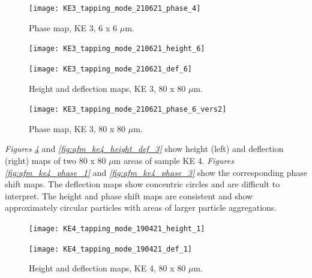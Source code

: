 \begin{figure}[H]
\centering
  \texttt{[image: KE3\_tapping\_mode\_210621\_phase\_4]}
\caption[Phase map, KE 3]{Phase map, KE 3, 6 x 6 $\mu$m.}
\label{fig:afm_ke3_phase_4}
\end{figure}


\begin{figure}[H]
\centering
\begin{minipage}{.45\textwidth}
  \centering
  \texttt{[image: KE3\_tapping\_mode\_210621\_height\_6]}
\end{minipage}
\begin{minipage}{.45\textwidth}
  \centering
  \texttt{[image: KE3\_tapping\_mode\_210621\_def\_6]}
\end{minipage}
\caption[Height and deflection maps, KE 3]{Height and deflection maps, KE 3, 80 x 80 $\mu$m.}
\label{fig:afm_ke3_height_def_5}
\end{figure}

\begin{figure}[H]
\centering
  \texttt{[image: KE3\_tapping\_mode\_210621\_phase\_6\_vers2]}
\caption[Phase map, KE 3]{Phase map, KE 3, 80 x 80 $\mu$m.}
\label{fig:afm_ke3_phase_5}
\end{figure}



\textit{Figures \ref{fig:afm_ke4_height_def_1}} and \textit{\ref{fig:afm_ke4_height_def_3}} show height (left) and deflection (right) maps of two 80 x 80 $\mu$m areas of sample KE 4. \textit{Figures \ref{fig:afm_ke4_phase_1}} and \textit{\ref{fig:afm_ke4_phase_3}} show the corresponding phase shift maps. The deflection maps show concentric circles and are difficult to interpret. The height and phase shift maps are consistent and show approximately circular particles with areas of larger particle aggregations. 

\begin{figure}[H]
\centering
\begin{minipage}{.45\textwidth}
  \centering
  \texttt{[image: KE4\_tapping\_mode\_190421\_height\_1]}
\end{minipage}
\begin{minipage}{.45\textwidth}
  \centering
  \texttt{[image: KE4\_tapping\_mode\_190421\_def\_1]}
\end{minipage}
\caption[Height and deflection maps, KE 4]{Height and deflection maps, KE 4, 80 x 80 $\mu$m.}
\label{fig:afm_ke4_height_def_1}
\end{figure}

